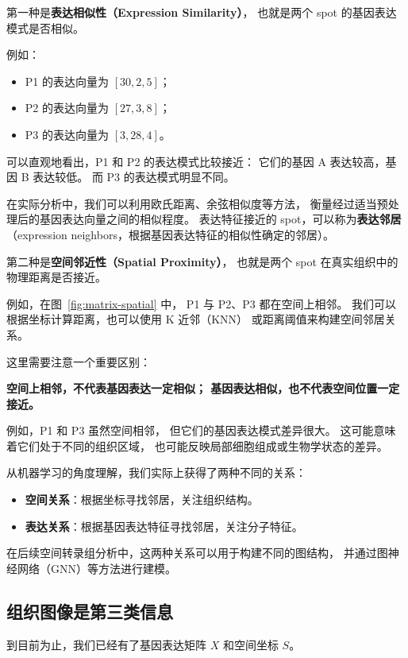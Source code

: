 \documentclass[UTF8,a4paper,11pt,fontset=fandol]{ctexart}
\newcommand{\term}[2]{{\color{accent}\textbf{#1}}（#2）}
\begin{document}
第一种是\textbf{表达相似性（Expression Similarity）}，
也就是两个 spot 的基因表达模式是否相似。

例如：

\begin{itemize}
  \item P1 的表达向量为 $[30,2,5]$；
  \item P2 的表达向量为 $[27,3,8]$；
  \item P3 的表达向量为 $[3,28,4]$。
\end{itemize}

可以直观地看出，P1 和 P2 的表达模式比较接近：
它们的基因 A 表达较高，基因 B 表达较低。
而 P3 的表达模式明显不同。

在实际分析中，我们可以利用欧氏距离、余弦相似度等方法，
衡量经过适当预处理后的基因表达向量之间的相似程度。
表达特征接近的 spot，可以称为\term{表达邻居}
{expression neighbors，根据基因表达特征的相似性确定的邻居}。

第二种是\textbf{空间邻近性（Spatial Proximity）}，
也就是两个 spot 在真实组织中的物理距离是否接近。

例如，在图~\ref{fig:matrix-spatial} 中，
P1 与 P2、P3 都在空间上相邻。
我们可以根据坐标计算距离，也可以使用 K 近邻（KNN）
或距离阈值来构建空间邻居关系。

这里需要注意一个重要区别：

\textbf{空间上相邻，不代表基因表达一定相似；
基因表达相似，也不代表空间位置一定接近。}

例如，P1 和 P3 虽然空间相邻，
但它们的基因表达模式差异很大。
这可能意味着它们处于不同的组织区域，
也可能反映局部细胞组成或生物学状态的差异。

从机器学习的角度理解，我们实际上获得了两种不同的关系：

\begin{itemize}
  \item \textbf{空间关系}：根据坐标寻找邻居，关注组织结构。
  \item \textbf{表达关系}：根据基因表达特征寻找邻居，关注分子特征。
\end{itemize}

在后续空间转录组分析中，这两种关系可以用于构建不同的图结构，
并通过图神经网络（GNN）等方法进行建模。

\subsection{组织图像是第三类信息}

到目前为止，我们已经有了基因表达矩阵 $X$ 和空间坐标 $S$。
\end{document}
